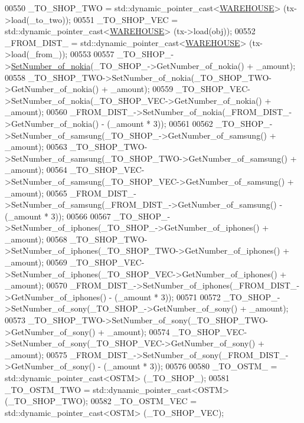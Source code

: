 \begin{DoxyCode}
00550                 \_TO\_SHOP\_TWO = std::dynamic\_pointer\_cast<\hyperlink{class_w_a_r_e_h_o_u_s_e}{WAREHOUSE}> (tx->load(\_to\_two));
00551                 \_TO\_SHOP\_VEC = std::dynamic\_pointer\_cast<\hyperlink{class_w_a_r_e_h_o_u_s_e}{WAREHOUSE}> (tx->load(obj));
00552                 \_FROM\_DIST\_ = std::dynamic\_pointer\_cast<\hyperlink{class_w_a_r_e_h_o_u_s_e}{WAREHOUSE}> (tx->load(\_from\_));
00553 
00557                 \_TO\_SHOP\_->\hyperlink{class_w_a_r_e_h_o_u_s_e_a13ace834a25aab61c689a7cedad94343}{SetNumber\_of\_nokia}(\_TO\_SHOP\_->GetNumber\_of\_nokia() + \_amount);
00558                 \_TO\_SHOP\_TWO->SetNumber\_of\_nokia(\_TO\_SHOP\_TWO->GetNumber\_of\_nokia() + \_amount);
00559                 \_TO\_SHOP\_VEC->SetNumber\_of\_nokia(\_TO\_SHOP\_VEC->GetNumber\_of\_nokia() + \_amount);
00560                 \_FROM\_DIST\_->SetNumber\_of\_nokia(\_FROM\_DIST\_->GetNumber\_of\_nokia() - (\_amount * 3));
00561 
00562                 \_TO\_SHOP\_->SetNumber\_of\_samsung(\_TO\_SHOP\_->GetNumber\_of\_samsung() + \_amount);
00563                 \_TO\_SHOP\_TWO->SetNumber\_of\_samsung(\_TO\_SHOP\_TWO->GetNumber\_of\_samsung() + \_amount);
00564                 \_TO\_SHOP\_VEC->SetNumber\_of\_samsung(\_TO\_SHOP\_VEC->GetNumber\_of\_samsung() + \_amount);
00565                 \_FROM\_DIST\_->SetNumber\_of\_samsung(\_FROM\_DIST\_->GetNumber\_of\_samsung() - (\_amount * 3));
00566 
00567                 \_TO\_SHOP\_->SetNumber\_of\_iphones(\_TO\_SHOP\_->GetNumber\_of\_iphones() + \_amount);
00568                 \_TO\_SHOP\_TWO->SetNumber\_of\_iphones(\_TO\_SHOP\_TWO->GetNumber\_of\_iphones() + \_amount);
00569                 \_TO\_SHOP\_VEC->SetNumber\_of\_iphones(\_TO\_SHOP\_VEC->GetNumber\_of\_iphones() + \_amount);
00570                 \_FROM\_DIST\_->SetNumber\_of\_iphones(\_FROM\_DIST\_->GetNumber\_of\_iphones() - (\_amount * 3));
00571 
00572                 \_TO\_SHOP\_->SetNumber\_of\_sony(\_TO\_SHOP\_->GetNumber\_of\_sony() + \_amount);
00573                 \_TO\_SHOP\_TWO->SetNumber\_of\_sony(\_TO\_SHOP\_TWO->GetNumber\_of\_sony() + \_amount);
00574                 \_TO\_SHOP\_VEC->SetNumber\_of\_sony(\_TO\_SHOP\_VEC->GetNumber\_of\_sony() + \_amount);
00575                 \_FROM\_DIST\_->SetNumber\_of\_sony(\_FROM\_DIST\_->GetNumber\_of\_sony() - (\_amount * 3));
00576 
00580                 \_TO\_OSTM\_ = std::dynamic\_pointer\_cast<OSTM> (\_TO\_SHOP\_);
00581                 \_TO\_OSTM\_TWO = std::dynamic\_pointer\_cast<OSTM> (\_TO\_SHOP\_TWO);
00582                 \_TO\_OSTM\_VEC = std::dynamic\_pointer\_cast<OSTM> (\_TO\_SHOP\_VEC);

\end{DoxyCode}
